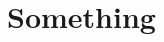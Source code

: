 \documentclass{book}
\begin{document}
\pagebreak

\let\cleardoublepage\clearpage




\tableofcontents

\newpage

\mainmatter


\part{Something} \label{part:something}

%



%

\end{document}
